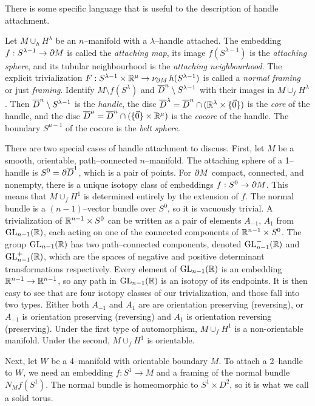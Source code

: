 There is some specific language that is useful to the description of handle attachment.

\begin{defn}
	Let $M\cup_h H^\lambda$ be an $n$--manifold with a $\lambda$--handle attached.
	The embedding $f:S^{\lambda-1}\to\partial M$ is called the \emph{attaching map}, its image $f(S^{\lambda-1})$ is the \emph{attaching sphere}, and its tubular neighbourhood is the \emph{attaching neighbourhood}.
	The explicit trivialization $F: S^{\lambda-1}\times \mathbb{R}^\mu\to \nu_{\partial M}\,h(S^{\lambda-1})$ is called a \emph{normal framing} or just \emph{framing}.
	Identify $M\setminus f(S^{\lambda})$ and $\overline{D}^n\setminus S^{\lambda-1}$ with their images in $M\cup_f H^\lambda$.
	Then $\overline{D}^n\setminus S^{\lambda-1}$ is the \emph{handle}, the disc $\overline{D}^\lambda=\overline{D}^n\cap(\mathbb{R}^\lambda\times\{\vec{0}\})$ is the \emph{core} of the handle, and the disc $\overline{D}^\mu=\overline{D}^n\cap(\{\vec{0}\}\times\mathbb{R}^\mu)$ is the \emph{cocore} of the handle.
	The boundary $S^{\mu-1}$ of the cocore is the \emph{belt sphere}.
\end{defn}

There are two special cases of handle attachment to discuss.
First, let $M$ be a smooth, orientable, path--connected $n$--manifold.
The attaching sphere of a 1--handle is $S^0=\partial \overline{D}^1$, which is a pair of points.
For $\partial M$ compact, connected, and nonempty, there is a unique isotopy class of embeddings $f:S^0\to\partial M$.
This means that $M\cup_f H^1$ is determined entirely by the extension of $f$.
The normal bundle is a $(n-1)$--vector bundle over $S^0$, so it is vacuously trivial.
A trivialization of $\mathbb{R}^{n-1}\times S^0$ can be written as a pair of elements $A_{-1}$, $A_1$ from $\textrm{GL}_{n-1}(\mathbb{R})$, each acting on one of the connected components of $\mathbb{R}^{n-1}\times S^0$.
The group $\textrm{GL}_{n-1}(\mathbb{R})$ has two path--connected components, denoted $\textrm{GL}_{n-1}^-(\mathbb{R})$ and $\textrm{GL}_{n-1}^+(\mathbb{R})$, which are the spaces of negative and positive determinant transformations respectively.
Every element of $\textrm{GL}_{n-1}(\mathbb{R})$ is an embedding $\mathbb{R}^{n-1}\to\mathbb{R}^{n-1}$, so any path in $\textrm{GL}_{n-1}(\mathbb{R})$ is an isotopy of its endpoints.
It is then easy to see that are four isotopy classes of our trivialization, and those fall into two types.
Either both $A_{-1}$ and $A_1$ are are orientation preserving (reversing), or $A_{-1}$ is orientation preserving (reversing) and $A_1$ is orientation reversing (preserving).
Under the first type of automorphism, $M\cup_f H^1$ is a non-orientable manifold.
Under the second, $M\cup_f H^1$ is orientable.

Next, let $W$ be a 4--manifold with orientable boundary $M$.
To attach a 2--handle to $W$, we need an embedding $f:S^1\to M$ and a framing of the normal bundle $N_M f(S^1)$.
The normal bundle is homeomorphic to $S^1\times D^2$, so it is what we call a solid torus.

